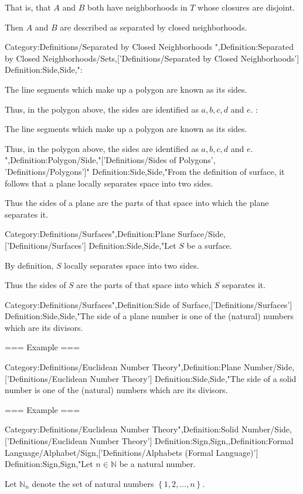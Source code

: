 That is, that $A$ and $B$ both have neighborhoods in $T$ whose closures are disjoint.


Then $A$ and $B$ are described as separated by closed neighborhoods.


Category:Definitions/Separated by Closed Neighborhoods
",Definition:Separated by Closed Neighborhoods/Sets,['Definitions/Separated by Closed Neighborhoods']
Definition:Side,Side,":

The line segments which make up a polygon are known as its sides.

Thus, in the polygon above, the sides are identified as $a, b, c, d$ and $e$.
:

The line segments which make up a polygon are known as its sides.

Thus, in the polygon above, the sides are identified as $a, b, c, d$ and $e$.
",Definition:Polygon/Side,"['Definitions/Sides of Polygons', 'Definitions/Polygons']"
Definition:Side,Side,"From the definition of surface, it follows that a plane locally separates space into two sides.

Thus the sides of a plane are the parts of that space into which the plane separates it.


Category:Definitions/Surfaces",Definition:Plane Surface/Side,['Definitions/Surfaces']
Definition:Side,Side,"Let $S$ be a surface.

By definition, $S$ locally separates space into two sides.

Thus the sides of $S$ are the parts of that space into which $S$ separates it.


Category:Definitions/Surfaces",Definition:Side of Surface,['Definitions/Surfaces']
Definition:Side,Side,"The side of a plane number is one of the (natural) numbers which are its divisors.


=== Example ===


Category:Definitions/Euclidean Number Theory",Definition:Plane Number/Side,['Definitions/Euclidean Number Theory']
Definition:Side,Side,"The side of a solid number is one of the (natural) numbers which are its divisors.


=== Example ===


Category:Definitions/Euclidean Number Theory",Definition:Solid Number/Side,['Definitions/Euclidean Number Theory']
Definition:Sign,Sign,,Definition:Formal Language/Alphabet/Sign,['Definitions/Alphabets (Formal Language)']
Definition:Sign,Sign,"Let $n \in \mathbb N$ be a natural number.

Let $\mathbb N_n$ denote the set of natural numbers $\left\lbrace 1, 2, \ldots, n \right\rbrace$.


